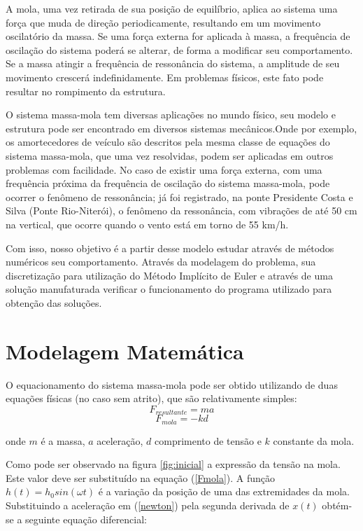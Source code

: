 \documentclass[12pt,fleqn]{article}
\begin{document}
A mola, uma vez retirada de sua posição de equilíbrio, aplica ao sistema uma força que muda de direção periodicamente, resultando em um movimento oscilatório da massa. Se uma força externa for aplicada à massa, a frequência de oscilação do sistema poderá se alterar, de forma a modificar seu comportamento. Se a massa atingir a frequência de ressonância do sistema, a amplitude de seu movimento crescerá indefinidamente. Em problemas físicos, este fato pode resultar no rompimento da estrutura.

O sistema massa-mola tem diversas aplicações no mundo físico, seu modelo e estrutura pode ser encontrado em diversos sistemas mecânicos.Onde por exemplo, os amortecedores de veículo são descritos pela mesma classe de equações do sistema massa-mola, que uma vez resolvidas, podem ser aplicadas em outros problemas com facilidade. No caso de existir uma força externa, com uma frequência próxima da frequência de oscilação do sistema massa-mola, pode ocorrer o fenômeno de ressonância; já foi registrado, na ponte Presidente Costa e Silva (Ponte Rio-Niterói), o fenômeno da ressonância, com vibrações de até 50 cm na vertical, que ocorre quando o vento está em torno de 55 km/h.

Com isso, nosso objetivo é a partir desse modelo estudar através de métodos numéricos seu comportamento. Através da modelagem do problema, sua discretização para utilização do Método Implícito de Euler e através de uma solução manufaturada verificar o funcionamento do programa utilizado para obtenção das soluções.

\section{Modelagem Matemática}
\par
O equacionamento do sistema massa-mola pode ser obtido utilizando de duas equações físicas (no caso sem atrito), que são relativamente simples:
\begin{equation}
\label{newton}
F_{resultante}=ma
\end{equation}
\begin{equation}
F_{mola}=-kd
\label{Fmola}
\end{equation}
\par
onde $m$ é a massa, $a$ aceleração, $d$ comprimento de tensão e $k$ constante da mola.
\par
Como pode ser observado na figura \ref{fig:inicial} a expressão da tensão na mola. Este valor deve ser substituído na equação (\ref{Fmola}). A função $h(t) = h_{0}sin(\omega t)$ é a variação da posição de uma das extremidades da mola. Substituindo a aceleração em (\ref{newton}) pela segunda derivada de $x(t)$ obtém-se a seguinte equação diferencial:
\end{document}
